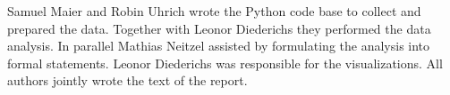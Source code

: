 \documentclass{article}
\theoremstyle{plain}
\theoremstyle{definition}
\theoremstyle{remark}
\begin{document}
Samuel Maier and Robin Uhrich wrote the Python code base to collect and
prepared the data. Together with Leonor Diederichs they performed the data
analysis. In parallel Mathias Neitzel assisted by formulating the analysis into
formal statements. Leonor Diederichs was responsible for the visualizations.
All authors jointly wrote the text of the report. \\





\end{document}
